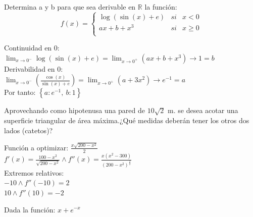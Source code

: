 \documentclass[addpoints,spanish, 12pt,a4paper]{exam}
\begin{document}
\begin{questions}
\begin{parts}
\end{parts}
\addpoints


\question[5] Determina a y b para que sea derivable en $\mathbb{R}$ la función: $$f(x)=\left\{\begin{matrix}
\log{\left(\sin{\left(x \right)} + e \right)} & si & x<0 \\
a x + b + x^{3} & si & x\geqslant 0 \\
\end{matrix}\right.$$ 


\begin{solution}
Continuidad en 0:\\ $\lim_{x \to 0^-} \log{\left(\sin{\left(x \right)} + e \right)} = \lim_{x \to 0^+}\left(a x + b + x^{3}\right) \to 1 = b $ \\ Derivabilidad en 0: \\ $\lim_{x \to 0^-}\left(\frac{\cos{\left(x \right)}}{\sin{\left(x \right)} + e}\right) = \lim_{x \to 0^+}\left(a + 3 x^{2}\right) \to e^{-1} = a $ \\ Por tanto: $\left\{ a : e^{-1}, \  b : 1\right\} $ \\ 
\end{solution}

\addpoints

\question[6] Aprovechando como hipotenusa una pared de $10 \sqrt{2}$ m. se desea acotar una superficie triangular de 
área máxima.¿Qué medidas deberán tener los otros dos lados (catetos)?

\begin{solution}
Función a optimizar: $\frac{x \sqrt{200 - x^{2}}}{2}$ \\ $f'(x)=\frac{100 - x^{2}}{\sqrt{200 - x^{2}}}\land f''(x)=\frac{x \left(x^{2} - 300\right)}{\left(200 - x^{2}\right)^{\frac{3}{2}}}$ \\ Extremos relativos: \\ $-10\land f''(-10)=2$ \\ $10\land f''(10)=-2$ \\
\end{solution}

\addpoints


\question Dada la función: $x + e^{- x}$ 

\end{questions}
\end{document}
